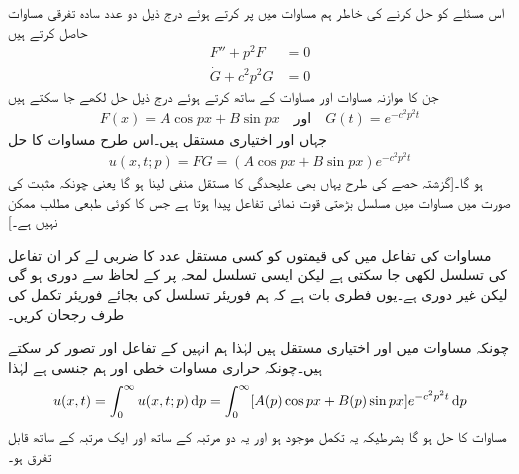 اس مسئلے کو حل کرنے کی خاطر ہم مساوات  میں  پر کرتے ہوئے درج ذیل دو عدد سادہ تفرقی مساوات حاصل کرتے ہیں
\begin{align}
F''+p^2F&=0\label{مساوات_جزوی_حراری_لامتناہی_پ}\\
\dot{G}+c^2p^2G&=0\label{مساوات_جزوی_حراری_لامتناہی_ت}
\end{align} 
جن کا موازنہ مساوات  اور مساوات  کے ساتھ کرتے ہوئے درج ذیل حل لکھے جا سکتے ہیں
\begin{align*}
F(x)=A\cos px+B\sin px\quad \text{اور}\quad G(t)=e^{-c^2p^2t}
\end{align*}
جہاں  اور  اختیاری  مستقل ہیں۔اس طرح مساوات  کا حل
\begin{align}\label{مساوات_جزوی_حراری_لامتناہی_ٹ}
u(x,t;p)=FG=(A\cos px+B\sin px)e^{-c^2p^2t}
\end{align}
ہو گا۔[گزشتہ حصے کی طرح یہاں بھی علیحدگی کا مستقل  منفی لینا ہو گا یعنی  چونکہ مثبت  کی صورت میں مساوات  میں مسلسل بڑھتی قوت نمائی تفاعل پیدا ہوتا ہے جس کا کوئی طبعی مطلب ممکن نہیں ہے۔]

مساوات  کی تفاعل میں  کی قیمتوں کو کسی مستقل عدد کا ضربی  لے کر ان تفاعل کی تسلسل لکھی جا سکتی ہے لیکن ایسی تسلسل  لمحہ  پر  کے لحاظ سے دوری ہو گی لیکن  غیر دوری ہے۔یوں فطری بات ہے کہ ہم فوریئر تسلسل کی بجائے فوریئر تکمل کی طرف رجحان کریں۔

چونکہ مساوات  میں  اور  اختیاری مستقل ہیں لہٰذا  ہم انہیں  کے تفاعل  اور  تصور کر سکتے ہیں۔چونکہ حراری مساوات خطی اور ہم جنسی ہے لہٰذا
\begin{align}\label{مساوات_جزوی_حراری_لامتناہی_ث}
u(x,t)=\int_0^{\infty}u(x,t;p)\dif p=\int_0^{\infty}[A(p)\cos px+B(p)\sin px]e^{-c^2p^2t}\dif p
\end{align}
مساوات  کا حل ہو گا بشرطیکہ یہ تکمل موجود ہو اور یہ دو مرتبہ  کے ساتھ اور ایک مرتبہ  کے ساتھ قابل تفرق ہو۔


